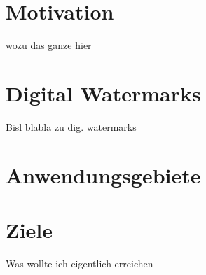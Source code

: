 
\section{Motivation}

wozu das ganze hier

\section{Digital Watermarks}

Bisl blabla zu dig. watermarks

\section{Anwendungsgebiete}

\section{Ziele}

Was wollte ich eigentlich erreichen
